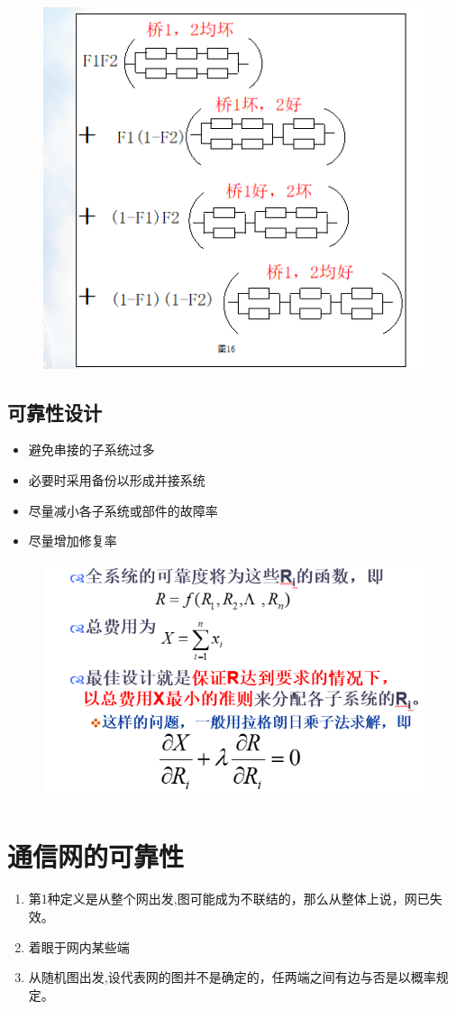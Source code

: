 \begin{figure}[H]
	\centering
	\includegraphics[width=0.7\linewidth]{figures/screenshot101}
	\caption{}
	\label{fig:screenshot101}
\end{figure}


\subsection{可靠性设计
}
\begin{itemize}
	\item 避免串接的子系统过多
	\item 必要时采用备份以形成并接系统
	\item 尽量减小各子系统或部件的故障率
	\item 尽量增加修复率
\end{itemize}
\begin{figure}[H]
	\centering
	\includegraphics[width=0.7\linewidth]{figures/screenshot102}
	\caption{}
	\label{fig:screenshot102}
\end{figure}

\section{通信网的可靠性}
\begin{enumerate}
	\item 第1种定义是从整个网出发,图可能成为不联结的，那么从整体上说，网已失效。
	\item 着眼于网内某些端
	\item 从随机图出发,设代表网的图并不是确定的，任两端之间有边与否是以概率规定。
\end{enumerate}

